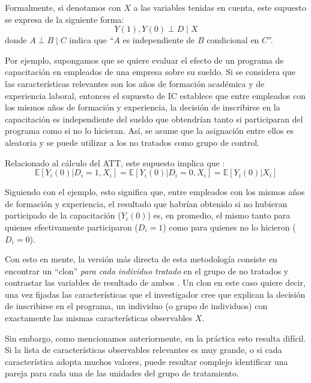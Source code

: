 \documentclass[../../main.tex]{subfiles}
\begin{document}
Formalmente, si denotamos con \(X\) a las variables tenidas en cuenta, este supuesto se
expresa de la siguiente forma:
\begin{equation}
    Y(1), Y(0) \perp D \mid X
\end{equation}
donde \(A \perp B \mid C\) indica que ``\(A\) es independiente de \(B\) condicional en \(C\)''.

Por ejemplo, supongamos que se quiere evaluar el efecto de un programa de capacitación en
empleados de una empresa sobre su sueldo. Si se considera que las características
relevantes son los años de formación académica y de experiencia laboral, entonces el
supuesto de IC establece que entre empleados con los mismos años de formación y
experiencia, la decisión de inscribirse en la capacitación es independiente del sueldo que
obtendrían tanto si participaran del programa como si no lo hicieran. Así, se asume que la
asignación entre ellos es aleatoria y se puede utilizar a los no tratados como grupo de
control.

Relacionado al cálculo del ATT, este supuesto implica que \cite{bernal}:
\begin{equation}
    \mathbb{E}\left[Y_i(0)|D_i=1, X_i\right] = \mathbb{E}\left[Y_i(0)|D_i=0, X_i\right] = \mathbb{E}\left[Y_i(0)|X_i\right]
\end{equation}

Siguiendo con el ejemplo, esto significa que, entre empleados con los mismos años de
formación y experiencia, el resultado que habrían obtenido si no hubieran participado de
la capacitación (\(Y_i(0)\)) es, en promedio, el mismo tanto para quienes efectivamente
participaron (\(D_i=1\)) como para quienes no lo hicieron (\(D_i=0\)).

Con esto en mente, la versión más directa de esta metodología consiste en encontrar un
``clon'' \textit{para cada individuo tratado} en el grupo de no tratados y contrastar las
variables de resultado de ambos \cite{bernal}. Un clon en este caso quiere decir, una vez
fijadas las características que el investigador cree que explican la decisión de
inscribirse en el programa, un individuo (o grupo de individuos) con exactamente las
mismas características observables \(X\).

Sin embargo, como mencionamos anteriormente, en la práctica esto resulta difícil. Si la
lista de características observables relevantes es muy grande, o si cada característica
adopta muchos valores, puede resultar complejo identificar una pareja para cada una de las
unidades del grupo de tratamiento.
\end{document}
